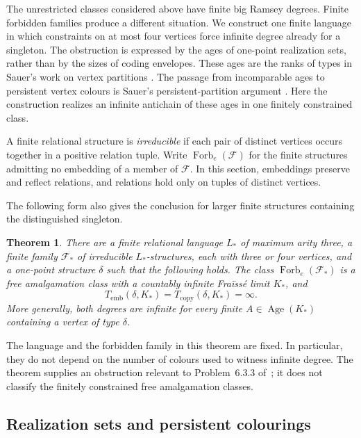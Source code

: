 \documentclass{article}
\numberwithin{equation}{section}
\newtheorem{theorem}{Theorem}[section]
\theoremstyle{definition}
\DeclareMathOperator{\Age}{Age}
\newcommand{\brd}{T_{\mathrm{emb}}}
\newcommand{\crd}{T_{\mathrm{copy}}}
\begin{document}
The unrestricted classes considered above have finite big Ramsey degrees.
Finite forbidden families produce a different situation. We construct one
finite language in which constraints on at most four vertices force infinite
degree already for a singleton. The obstruction is expressed by the ages of
one-point realization sets, rather than by the sizes of coding envelopes.
These ages are the ranks of types in Sauer's work on vertex partitions
\cite{SauerHomogeneous2020}. The passage from incomparable ages to
persistent vertex colours is Sauer's persistent-partition argument
\cite[Section~5]{SauerCanonicalVertex2003}. Here the construction realizes
an infinite antichain of these ages in one finitely constrained class.

A finite relational structure is \emph{irreducible} if each pair of distinct
vertices occurs together in a positive relation tuple. Write
$\operatorname{Forb}_{e}(\mathcal F)$ for the finite structures admitting no
embedding of a member of $\mathcal F$. In this section, embeddings
preserve and reflect relations, and relations hold only on tuples of
distinct vertices.

The following form also gives the conclusion for larger finite structures
containing the distinguished singleton.

\begin{theorem}\label{neg:main}
There are a finite relational language $L_*$ of maximum arity three, a finite
family $\mathcal F_*$ of irreducible $L_*$-structures, each with three or four
vertices, and a one-point structure $\delta$ such that the following holds.
The class $\operatorname{Forb}_{e}(\mathcal F_*)$ is a free amalgamation
class with a countably infinite Fra\"iss\'e limit $K_*$, and
\[
 \brd(\delta,K_*)=\crd(\delta,K_*)=\infty.
\]
More generally, both degrees are infinite for every finite
$A\in\Age(K_*)$ containing a vertex of type $\delta$.
\end{theorem}

The language and the forbidden family in this theorem are fixed. In
particular, they do not depend on the number of colours used to witness
infinite degree. The theorem supplies an obstruction relevant to
Problem~6.3.3 of~\cite{BinaryExact}; it does not classify the finitely
constrained free amalgamation classes.

\subsection{Realization sets and persistent colourings}
\label{neg:types}
\end{document}
